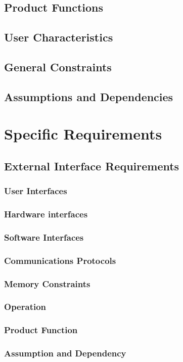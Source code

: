 \documentclass[a4paper, 12pt]{article}
\begin{document}
	\subsection{Product Functions}
	\subsection{User Characteristics}
	\subsection{General Constraints}
	\subsection{Assumptions and Dependencies}

\section{Specific Requirements}
	\subsection{External Interface Requirements}
		\subsubsection{User Interfaces}
		\subsubsection{Hardware interfaces}
		\subsubsection{Software Interfaces}
		\subsubsection{Communications Protocols}
		\subsubsection{Memory Constraints}
		\subsubsection{Operation}
		\subsubsection{Product Function}
		\subsubsection{Assumption and Dependency}
\end{document}
